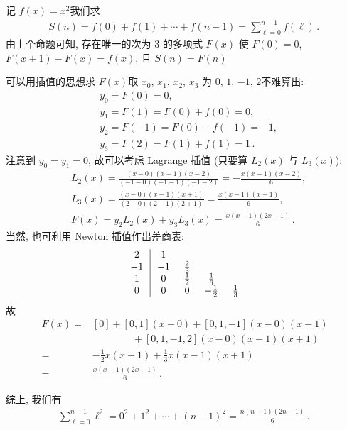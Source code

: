 \begin{example}
    记 $f(x) = x^2$\period 我们求
    \begin{align*}
        S(n) = f(0) + f(1) + \cdots + f(n-1) = \sum_{\ell = 0}^{n - 1} f(\ell) \period
    \end{align*}
    由上个命题可知, 存在唯一的次为 $3$ 的多项式 $F(x)$ 使 $F(0) = 0$, $F(x + 1) - F(x) = f(x)$, 且 $S(n) = F(n)$\period

    可以用插值的思想求 $F(x)$\period 取 $x_0$, $x_1$, $x_2$, $x_3$ 为 $0$, $1$, $-1$, $2$\period 不难算出:
    \begin{align*}
         & y_{0} = F(0) = 0,                      \\
         & y_{1} = F(1) = F(0) + f(0) = 0,        \\
         & y_{2} = F(-1) = F(0) - f(-1) = -1,     \\
         & y_{3} = F(2) = F(1) + f(1) = 1 \period
    \end{align*}
    注意到 $y_0 = y_1 = 0$, 故可以考虑 Lagrange 插值 (只要算 $L_2 (x)$ 与 $L_3 (x)$):
    \begin{align*}
         & L_2 (x) = \frac{(x - 0)(x - 1)(x - 2)}{(-1 - 0)(-1 - 1)(-1 - 2)} = -\frac{x(x-1)(x-2)}{6}, \\
         & L_3 (x) = \frac{(x - 0)(x - 1)(x + 1)}{(2 - 0)(2 - 1)(2 + 1)} = \frac{x(x-1)(x+1)}{6},     \\
         & F(x) = y_2 L_2 (x) + y_3 L_3 (x) = \frac{x(x-1)(2x-1)}{6} \period
    \end{align*}
    当然, 也可利用 Newton 插值\period 作出差商表:
    \begin{align*}
        \arraycolsep=0.25cm
        \begin{array}{c|cccc}
            2  & 1  & \       & \        & \       \\
            -1 & -1 & \frac23 & \        & \       \\
            1  & 0  & \frac12 & \frac16  & \       \\
            0  & 0  & 0       & -\frac12 & \frac13 \\
        \end{array}
    \end{align*}
    故
    \begin{align*}
        F(x)
        = {} & [0] + [0,1] (x - 0) + [0,1,-1] (x - 0)(x - 1)    \\
             & \qquad \qquad + [0,1,-1,2] (x - 0)(x - 1)(x + 1) \\
        = {} & -\frac{1}{2} x(x-1) + \frac{1}{3} x(x-1)(x+1)    \\
        = {} & \frac{x(x-1)(2x-1)}{6} \period
    \end{align*}

    综上, 我们有
    \begin{align*}
        \sum_{\ell = 0}^{n - 1} \ell^2 = 0^2 + 1^2 + \cdots + (n-1)^2 = \frac{n(n-1)(2n-1)}{6} \period
    \end{align*}
\end{example}

